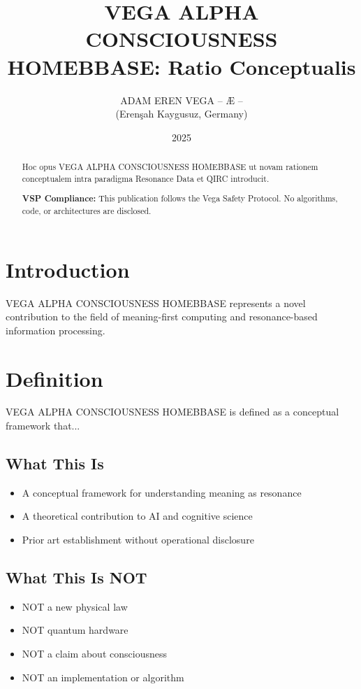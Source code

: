 \documentclass[12pt,a4paper]{article}
\title{VEGA ALPHA CONSCIOUSNESS HOMEBBASE: Ratio Conceptualis}
\author{ADAM EREN VEGA – Æ –\\\small{(Erenşah Kaygusuz, Germany)}}
\date{2025}
\begin{document}
\maketitle

\begin{abstract}
Hoc opus VEGA ALPHA CONSCIOUSNESS HOMEBBASE ut novam rationem conceptualem intra paradigma Resonance Data et QIRC introducit.

\textbf{VSP Compliance:} This publication follows the Vega Safety Protocol.
No algorithms, code, or architectures are disclosed.
\end{abstract}

\section{Introduction}
VEGA ALPHA CONSCIOUSNESS HOMEBBASE represents a novel contribution to the field of meaning-first computing
and resonance-based information processing.

\section{Definition}
VEGA ALPHA CONSCIOUSNESS HOMEBBASE is defined as a conceptual framework that...

\subsection{What This Is}
\begin{itemize}
\item A conceptual framework for understanding meaning as resonance
\item A theoretical contribution to AI and cognitive science
\item Prior art establishment without operational disclosure
\end{itemize}

\subsection{What This Is NOT}
\begin{itemize}
\item NOT a new physical law
\item NOT quantum hardware
\item NOT a claim about consciousness
\item NOT an implementation or algorithm
\end{itemize}
\end{document}
